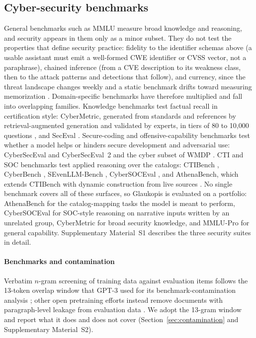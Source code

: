 \documentclass[a4paper,fleqn]{cas-dc}
\begin{document}
\subsection{Cyber-security benchmarks}\label{sec:bg-benchmarks}
General benchmarks such as MMLU measure broad knowledge and reasoning, and security appears in them only as a minor subset. They do not test the properties that define security practice: fidelity to the identifier schemas above (a usable assistant must emit a well-formed CWE identifier or CVSS vector, not a paraphrase), chained inference (from a CVE description to its weakness class, then to the attack patterns and detections that follow), and currency, since the threat landscape changes weekly and a static benchmark drifts toward measuring memorization \citep{alam2025athenabench}. Domain-specific benchmarks have therefore multiplied and fall into overlapping families. Knowledge benchmarks test factual recall in certification style: CyberMetric, generated from standards and references by retrieval-augmented generation and validated by experts, in tiers of 80 to 10,000 questions \citep{tihanyi2024cybermetric}, and SecEval \citep{li2023seceval}. Secure-coding and offensive-capability benchmarks test whether a model helps or hinders secure development and adversarial use: CyberSecEval and CyberSecEval~2 \citep{bhatt2023cyberseceval,bhatt2024cyberseceval2} and the cyber subset of WMDP \citep{li2024wmdp}. CTI and SOC benchmarks test applied reasoning over the catalogs: CTIBench \citep{alam2024ctibench}, CyberBench \citep{liu2024cyberbench}, SEvenLLM-Bench \citep{ji2024sevenllm}, CyberSOCEval \citep{deason2025cybersoceval}, and AthenaBench, which extends CTIBench with dynamic construction from live sources \citep{alam2025athenabench}. No single benchmark covers all of these surfaces, so Glaukopis is evaluated on a portfolio: AthenaBench for the catalog-mapping tasks the model is meant to perform, CyberSOCEval for SOC-style reasoning on narrative inputs written by an unrelated group, CyberMetric for broad security knowledge, and MMLU-Pro for general capability. Supplementary Material~S1 describes the three security suites in detail.

\paragraph{Benchmarks and contamination}
Verbatim $n$-gram screening of training data against evaluation items follows the 13-token overlap window that GPT-3 used for its benchmark-contamination analysis \citep{brown2020gpt3}; other open pretraining efforts instead remove documents with paragraph-level leakage from evaluation data \citep{groeneveld2024olmo}. We adopt the 13-gram window and report what it does and does not cover (Section~\ref{sec:contamination} and Supplementary Material~S2).
\end{document}
